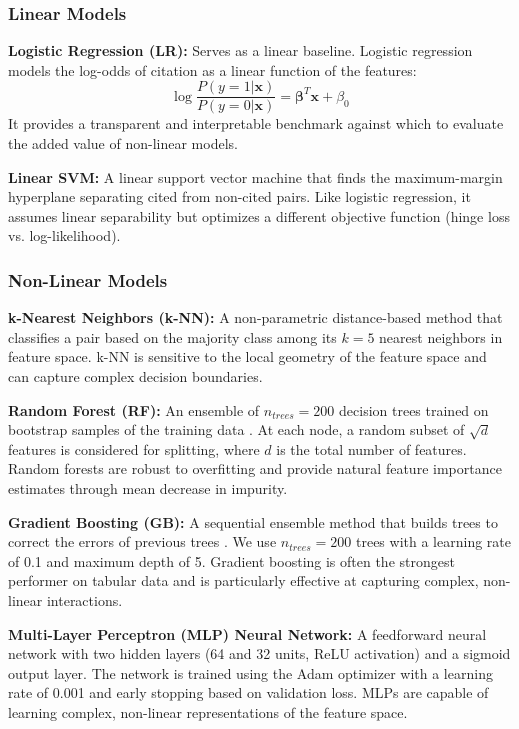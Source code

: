 \documentclass[12pt,a4paper]{article}
\begin{document}
\subsubsection{Linear Models}

\textbf{Logistic Regression (LR):} Serves as a linear baseline. Logistic regression models the log-odds of citation as a linear function of the features:
\begin{equation}
\log\frac{P(y=1|\mathbf{x})}{P(y=0|\mathbf{x})} = \boldsymbol{\beta}^T \mathbf{x} + \beta_0
\end{equation}
It provides a transparent and interpretable benchmark against which to evaluate the added value of non-linear models.

\textbf{Linear SVM:} A linear support vector machine that finds the maximum-margin hyperplane separating cited from non-cited pairs. Like logistic regression, it assumes linear separability but optimizes a different objective function (hinge loss vs. log-likelihood).

\subsubsection{Non-Linear Models}

\textbf{k-Nearest Neighbors (k-NN):} A non-parametric distance-based method that classifies a pair based on the majority class among its $k=5$ nearest neighbors in feature space. k-NN is sensitive to the local geometry of the feature space and can capture complex decision boundaries.

\textbf{Random Forest (RF):} An ensemble of $n_{trees} = 200$ decision trees trained on bootstrap samples of the training data \citep{breiman2001random}. At each node, a random subset of $\sqrt{d}$ features is considered for splitting, where $d$ is the total number of features. Random forests are robust to overfitting and provide natural feature importance estimates through mean decrease in impurity.

\textbf{Gradient Boosting (GB):} A sequential ensemble method that builds trees to correct the errors of previous trees \citep{natekin2013gradient}. We use $n_{trees} = 200$ trees with a learning rate of 0.1 and maximum depth of 5. Gradient boosting is often the strongest performer on tabular data and is particularly effective at capturing complex, non-linear interactions.

\textbf{Multi-Layer Perceptron (MLP) Neural Network:} A feedforward neural network with two hidden layers (64 and 32 units, ReLU activation) and a sigmoid output layer. The network is trained using the Adam optimizer with a learning rate of 0.001 and early stopping based on validation loss. MLPs are capable of learning complex, non-linear representations of the feature space.
\end{document}

